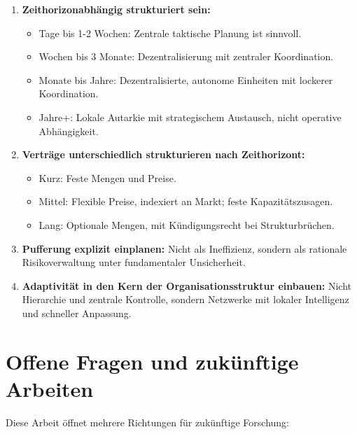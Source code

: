\documentclass[12pt, a4paper, titlepage]{report}
\theoremstyle{definition}
\theoremstyle{remark}
\begin{document}
\begin{enumerate}
  \item \textbf{Zeithorizonabhängig strukturiert sein:}
  \begin{itemize}
    \item Tage bis 1-2 Wochen: Zentrale taktische Planung ist sinnvoll.
    \item Wochen bis 3 Monate: Dezentralisierung mit zentraler Koordination.
    \item Monate bis Jahre: Dezentralisierte, autonome Einheiten mit lockerer Koordination.
    \item Jahre+: Lokale Autarkie mit strategischem Austausch, nicht operative Abhängigkeit.
  \end{itemize}
  
  \item \textbf{Verträge unterschiedlich strukturieren nach Zeithorizont:}
  \begin{itemize}
    \item Kurz: Feste Mengen und Preise.
    \item Mittel: Flexible Preise, indexiert an Markt; feste Kapazitätszusagen.
    \item Lang: Optionale Mengen, mit Kündigungsrecht bei Strukturbrüchen.
  \end{itemize}
  
  \item \textbf{Pufferung explizit einplanen:} Nicht als Ineffizienz, sondern als rationale Risikoverwaltung unter fundamentaler Unsicherheit.
  
  \item \textbf{Adaptivität in den Kern der Organisationsstruktur einbauen:} Nicht Hierarchie und zentrale Kontrolle, sondern Netzwerke mit lokaler Intelligenz und schneller Anpassung.
\end{enumerate}

\section{Offene Fragen und zukünftige Arbeiten}

Diese Arbeit öffnet mehrere Richtungen für zukünftige Forschung:
\end{document}
